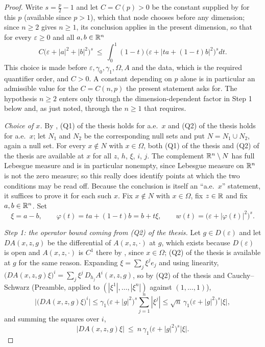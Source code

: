\begin{proof}
Write $s=\frac p2-1$ and let $C=C(p)>0$ be the constant supplied by
 for this $p$ (available since $p>1$),
which that node chooses before any dimension; since $n\ge2$ gives $n\ge1$, its
conclusion applies in the present dimension, so that for every
$\varepsilon\ge0$ and all $a,b\in\mathbb{R}^n$
\[
C\bigl(\varepsilon+|a|^2+|b|^2\bigr)^{s}
\ \le\ \int_0^1(1-t)\bigl(\varepsilon+|ta+(1-t)b|^2\bigr)^{s}dt .
\tag{$\dagger$}
\]
This choice is made before $\varepsilon,\gamma_0,\gamma_1,\Omega,A$ and the
data, which is the required quantifier order, and $C>0$.  A constant depending
on $p$ alone is in particular an admissible value for the $C=C(n,p)$ the
present statement asks for.  The hypothesis $n\ge2$ enters only through the
dimension-dependent factor in Step 1 below and, as just noted, through the
$n\ge1$ that  requires.

\emph{Choice of $x$.}  By , (Q1) of the thesis holds
for a.e.\ $x$ and (Q2) of the thesis holds for a.e.\ $x$; let $N_1$ and $N_2$ be the
corresponding null sets and put $N=N_1\cup N_2$, again a null set.  For every
$x\notin N$ with $x\in\Omega$, both (Q1) of the thesis and (Q2) of the thesis are
available at $x$ for all $z$, $h$, $\xi$, $i$, $j$.  The complement
$\mathbb{R}^n\setminus N$ has full Lebesgue measure and is in particular nonempty,
since Lebesgue measure on $\mathbb{R}^n$ is not the zero measure; so this really does
identify points at which the two conditions may be read off.  Because the
conclusion is itself an ``a.e.\ $x$'' statement, it suffices to prove it for
each such $x$.  Fix $x\notin N$ with $x\in\Omega$, fix $z\in\mathbb{R}$ and fix
$a,b\in\mathbb{R}^n$.  Set
\[
\xi=a-b,\qquad \varphi(t)=ta+(1-t)b=b+t\xi,\qquad
w(t)=\bigl(\varepsilon+|\varphi(t)|^2\bigr)^{s} .
\]

\emph{Step 1: the operator bound coming from (Q2) of the thesis.}  Let
$g\in D(\varepsilon)$ and let $DA(x,z,g)$ be the differential of
$A(x,z,\cdot)$ at $g$, which exists because $D(\varepsilon)$ is open and
$A(x,z,\cdot)$ is $C^1$ there by , since
$x\in\Omega$; (Q2) of the thesis is available at $g$ for the same reason.  Expanding $\xi=\sum_j\xi^je_j$ and using linearity,
$\bigl(DA(x,z,g)\xi\bigr)^i=\sum_{j}\xi^j\,D_{h_j}A^i(x,z,g)$, so by
(Q2) of the thesis and Cauchy--Schwarz (Preamble, applied to
$(|\xi^1|,\dots,|\xi^n|)$ against $(1,\dots,1)$),
\[
\bigl|\bigl(DA(x,z,g)\xi\bigr)^i\bigr|
\le\gamma_1\bigl(\varepsilon+|g|^2\bigr)^{s}\sum_{j=1}^n|\xi^j|
\le\sqrt n\,\gamma_1\bigl(\varepsilon+|g|^2\bigr)^{s}|\xi| ,
\]
and summing the squares over $i$,
\[
\bigl|DA(x,z,g)\xi\bigr|\ \le\ n\,\gamma_1\bigl(\varepsilon+|g|^2\bigr)^{s}|\xi| .
\tag{$*$}
\]


\end{proof}
